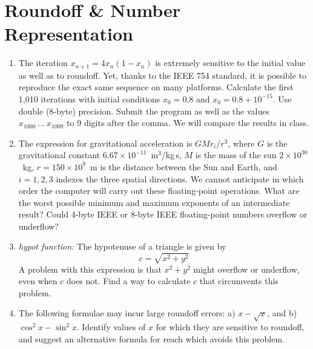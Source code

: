 \documentclass{article}
\begin{document}
\section{Roundoff \& Number Representation}

\begin{enumerate}
\item \label{prbl:logistic1000}
The iteration $x_{n+1} = 4x_n (1-x_n)$ is extremely sensitive to the initial value as well as to roundoff. Yet, thanks to the IEEE 754 standard, it is possible to reproduce the exact same sequence on many platforms.
Calculate the first 1,010 iterations with initial conditions $x_0=0.8$ and $x_0 = 0.8+10^{-15}$. Use double (8-byte) precision.  
Submit the program as well as the values $x_{1000}~\dots~x_{1009}$ to 9 digits after the comma.
We will compare the results in class.


\item \label{prbl:Goverflow}
The expression for gravitational acceleration is $G M r_i /r^3$, where
$G$ is the gravitational constant $6.67\times 10^{-11}$~m$^3$/kg\,s,
$M$ is the mass of the sun $2\times 10^{30}$~kg, $r=150\times 10^9$~m is the distance between the Sun and Earth, and $i=1, 2, 3$ indexes the three spatial directions.
We cannot anticipate in which order the computer will carry out these floating-point operations. What are the worst possible minimum and maximum exponents of an intermediate result?  Could 4-byte IEEE or 8-byte IEEE floating-point numbers overflow or underflow?


\item {\it hypot function:} The hypotenuse of a triangle is given by
  \[
  c = \sqrt{x^2+y^2}
  \]
  A problem with this expression is that $x^2+y^2$ might overflow or underflow, even when $c$ does not. Find a way to calculate $c$ that circumvents this problem.


\item 
  The following formulae may incur large roundoff errors:
a) $x-\sqrt{x}$, and 
b) $\cos^2 x - \sin^2 x$.  
Identify values of $x$ for which they are sensitive to roundoff, and
suggest an alternative formula for reach which avoids this problem.

  
\end{enumerate}
\end{document}
